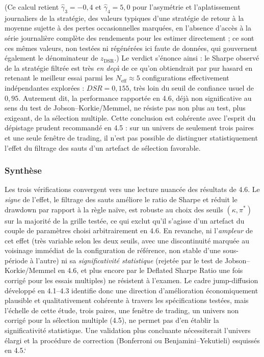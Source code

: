 \documentclass{article}
\begin{document}
(Ce calcul retient $\hat\gamma_3=-0{,}4$ et $\hat\gamma_4=5{,}0$ pour l'asymétrie et l'aplatissement journaliers de la stratégie, des valeurs typiques d'une stratégie de retour à la moyenne sujette à des pertes occasionnelles marquées, en l'absence d'accès à la série journalière complète des rendements pour les estimer directement ; ce sont ces mêmes valeurs, non testées ni régénérées ici faute de données, qui gouvernent également le dénominateur de $z_{\text{DSR}}$.) Le verdict s'énonce ainsi : le Sharpe observé de la stratégie filtrée est très \emph{en deçà} de ce qu'on obtiendrait par pur hasard en retenant le meilleur essai parmi les $N_{\text{eff}}\approx 5$ configurations effectivement indépendantes explorées : $DSR=0{,}155$, très loin du seuil de confiance usuel de $0{,}95$. Autrement dit, la performance rapportée en 4.6, déjà non significative au sens du test de Jobson--Korkie/Memmel, ne résiste pas non plus au test, plus exigeant, de la sélection multiple. Cette conclusion est cohérente avec l'esprit du dépistage prudent recommandé en 4.5 : sur un univers de seulement trois paires et une seule fenêtre de trading, il n'est pas possible de distinguer statistiquement l'effet du filtrage des sauts d'un artefact de sélection favorable.

\subsubsection*{Synthèse}
Les trois vérifications convergent vers une lecture nuancée des résultats de 4.6. Le \emph{signe} de l'effet, le filtrage des sauts améliore le ratio de Sharpe et réduit le drawdown par rapport à la règle naïve, est robuste au choix des seuils $(\kappa,\pi^\ast)$ sur la majorité de la grille testée, ce qui exclut qu'il s'agisse d'un artefact du couple de paramètres choisi arbitrairement en 4.6. En revanche, ni l'\emph{ampleur} de cet effet (très variable selon les deux seuils, avec une discontinuité marquée au voisinage immédiat de la configuration de référence, non stable d'une sous-période à l'autre) ni sa \emph{significativité statistique} (rejetée par le test de Jobson--Korkie/Memmel en 4.6, et plus encore par le Deflated Sharpe Ratio une fois corrigé pour les essais multiples) ne résistent à l'examen. Le cadre jump-diffusion développé en 4.1--4.3 identifie donc une direction d'amélioration économiquement plausible et qualitativement cohérente à travers les spécifications testées, mais l'échelle de cette étude, trois paires, une fenêtre de trading, un univers non corrigé pour la sélection multiple (4.5), ne permet pas d'en établir la significativité statistique. Une validation plus concluante nécessiterait l'univers élargi et la procédure de correction (Bonferroni ou Benjamini--Yekutieli) esquissés en 4.5.`
\end{document}
